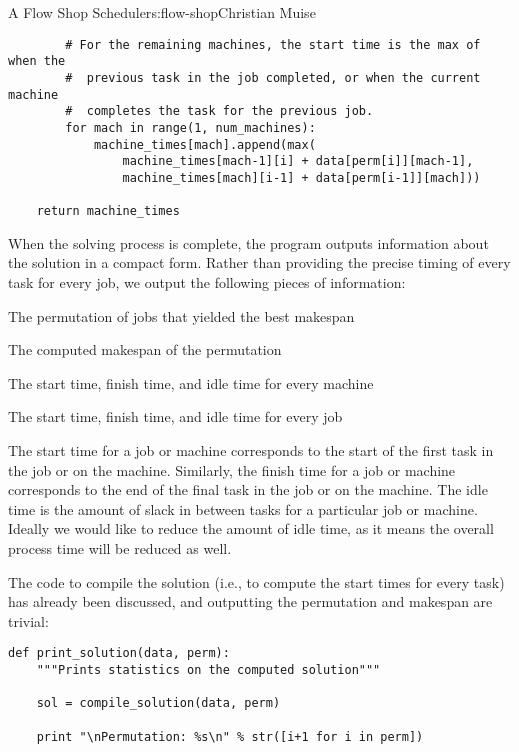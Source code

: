 \begin{aosachapter}{A Flow Shop Scheduler}{s:flow-shop}{Christian Muise}
\begin{verbatim}
        # For the remaining machines, the start time is the max of when the
        #  previous task in the job completed, or when the current machine
        #  completes the task for the previous job.
        for mach in range(1, num_machines):
            machine_times[mach].append(max(
                machine_times[mach-1][i] + data[perm[i]][mach-1],
                machine_times[mach][i-1] + data[perm[i-1]][mach]))

    return machine_times
\end{verbatim}

\label{printing-solutions}

When the solving process is complete, the program outputs information
about the solution in a compact form. Rather than providing the precise
timing of every task for every job, we output the following pieces of
information:

\begin{aosaenumerate}
\def\labelenumi{\arabic{enumi}.}

\item
  The permutation of jobs that yielded the best makespan
\item
  The computed makespan of the permutation
\item
  The start time, finish time, and idle time for every machine
\item
  The start time, finish time, and idle time for every job
\end{aosaenumerate}

The start time for a job or machine corresponds to the start of the
first task in the job or on the machine. Similarly, the finish time for
a job or machine corresponds to the end of the final task in the job or
on the machine. The idle time is the amount of slack in between tasks
for a particular job or machine. Ideally we would like to reduce the
amount of idle time, as it means the overall process time will be
reduced as well.

The code to compile the solution (i.e., to compute the start times for
every task) has already been discussed, and outputting the permutation
and makespan are trivial:

\begin{verbatim}
def print_solution(data, perm):
    """Prints statistics on the computed solution"""

    sol = compile_solution(data, perm)

    print "\nPermutation: %s\n" % str([i+1 for i in perm])


\end{verbatim}
\end{aosachapter}
